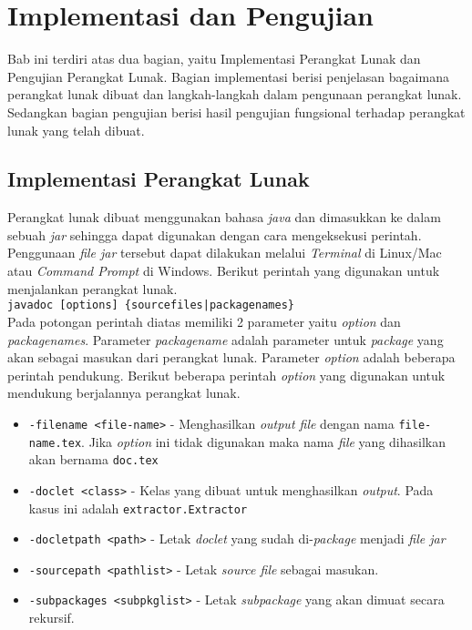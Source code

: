 \chapter{Implementasi dan Pengujian}
\label{sec: Implementasi dan Pengujian}

Bab ini terdiri atas dua bagian, yaitu Implementasi Perangkat Lunak dan Pengujian Perangkat Lunak. Bagian implementasi berisi penjelasan bagaimana perangkat lunak dibuat dan langkah-langkah dalam pengunaan perangkat lunak. Sedangkan bagian pengujian berisi hasil pengujian fungsional terhadap perangkat lunak yang telah dibuat.
\section{Implementasi Perangkat Lunak}
\label{sec: Implementasi Perangkat Lunak}

Perangkat lunak dibuat menggunakan bahasa {\it java} dan dimasukkan ke dalam sebuah {\it jar} sehingga dapat digunakan dengan cara mengeksekusi perintah. Penggunaan {\it file jar} tersebut dapat dilakukan melalui {\it Terminal} di Linux/Mac atau {\it Command Prompt} di Windows. Berikut perintah yang digunakan untuk menjalankan perangkat lunak.
\\

{\tt javadoc [options] \{sourcefiles|packagenames\}}
\\

Pada potongan perintah diatas memiliki 2 parameter yaitu {\it option} dan {\it packagenames}. Parameter {\it packagename} adalah parameter untuk {\it package} yang akan sebagai masukan dari perangkat lunak. Parameter {\it option} adalah beberapa perintah pendukung. Berikut beberapa perintah {\it option} yang digunakan untuk mendukung berjalannya perangkat lunak.
\begin{itemize}
	\item {\tt -filename <file-name>} - Menghasilkan {\it output file} dengan nama {\tt file-name.tex}. Jika {\it option} ini tidak digunakan maka nama {\it file} yang dihasilkan akan bernama {\tt doc.tex}
	\item {\tt -doclet <class>} - Kelas yang dibuat untuk menghasilkan {\it output}. Pada kasus ini adalah {\tt extractor.Extractor}
	\item {\tt -docletpath <path>} - Letak {\it doclet} yang sudah di-{\it package} menjadi {\it file jar}
	\item {\tt -sourcepath <pathlist>} - Letak {\it source file} sebagai masukan.
	\item {\tt -subpackages <subpkglist>} - Letak {\it subpackage} yang akan dimuat secara rekursif.
\end{itemize}

